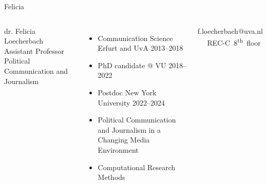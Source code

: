 \documentclass[compress]{beamer}
\begin{document}
\begin{frame}{Felicia}
	
	\begin{columns}
		dr. Felicia Loecherbach \\
		Assistant Professor Political Communication and Journalism \\
		\begin{itemize}
			\item Communication Science Erfurt and UvA 2013--2018
			\item PhD candidate @ VU 2018--2022
			\item Postdoc New York University 2022--2024
			\item Political Communication and Journalism in a Changing Media Environment
			\item Computational Research Methods
		\end{itemize}
		f.loecherbach@uva.nl ~~ REC-C~8\textsuperscript{th}~floor 
	\end{columns}

\end{frame}
\end{document}
